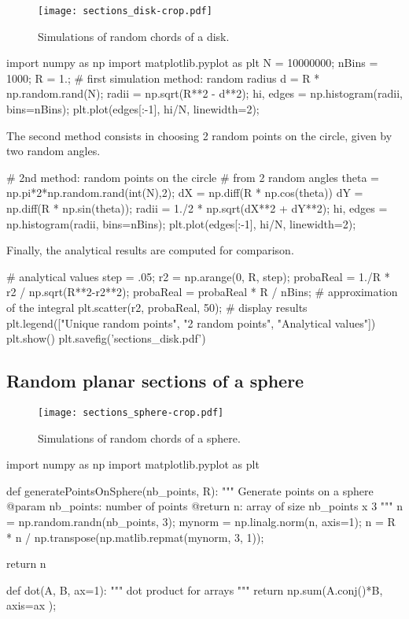 \begin{figure}[H]
 \centering\caption{Simulations of random chords of a disk.}%
 \texttt{[image: sections\_disk-crop.pdf]}%
 \label{fig:stereology:python:disk}%
\end{figure}

\begin{python}
import numpy as np
import matplotlib.pyplot as plt
N = 10000000;
nBins = 1000;
R = 1.;
# first simulation method: random radius
d = R * np.random.rand(N);
radii = np.sqrt(R**2 - d**2);
hi, edges = np.histogram(radii, bins=nBins);
plt.plot(edges[:-1], hi/N, linewidth=2);
\end{python}

The second method consists in choosing 2 random points on the circle, given by two random angles.
\begin{python}
# 2nd method: random points on the circle
# from 2 random angles
theta = np.pi*2*np.random.rand(int(N),2);
dX = np.diff(R * np.cos(theta))
dY = np.diff(R * np.sin(theta));
radii = 1./2 * np.sqrt(dX**2 + dY**2);
hi, edges = np.histogram(radii, bins=nBins);
plt.plot(edges[:-1], hi/N, linewidth=2);
\end{python}

Finally, the analytical results are computed for comparison.
\begin{python}
# analytical values
step = .05;
r2 = np.arange(0, R, step);
probaReal = 1./R * r2 / np.sqrt(R**2-r2**2);
probaReal = probaReal * R / nBins; # approximation of the integral
plt.scatter(r2, probaReal, 50);
# display results
plt.legend(["Unique random points", "2 random points", "Analytical values"])
plt.show()
plt.savefig('sections_disk.pdf')
\end{python}
\vspace*{-8pt}
\subsection{Random planar sections of a sphere}
\vspace*{-8pt}
\begin{figure}[H]
 \centering\caption{Simulations of random chords of a sphere.}%
 \texttt{[image: sections\_sphere-crop.pdf]}%
 \label{fig:stereology:python:sphere}%
\end{figure}

\begin{python}
import numpy as np
import matplotlib.pyplot as plt

def generatePointsOnSphere(nb_points, R):
    """
    Generate points on a sphere
    @param nb_points: number of points
    @return n: array of size nb_points x 3
    """
    n = np.random.randn(nb_points, 3);
    mynorm = np.linalg.norm(n, axis=1);
    n = R * n / np.transpose(np.matlib.repmat(mynorm, 3, 1));
    
    return n

def dot(A, B, ax=1):
    """ dot product for arrays
    """
    return np.sum(A.conj()*B, axis=ax );
\end{python}

